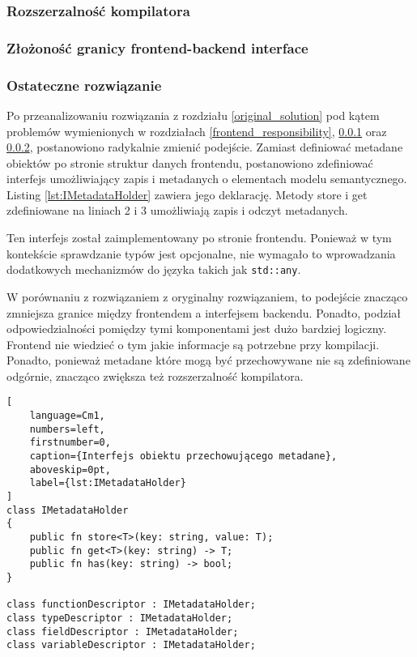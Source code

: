 \subsubsection{Rozszerzalność kompilatora}\label{compiler_extensibility}

\subsubsection{Złożoność granicy frontend-backend interface} \label{frontend_backend_complexity}

\subsubsection{Ostateczne rozwiązanie}\label{final_solution}
Po przeanalizowaniu rozwiązania z rozdziału \ref{original_solution} pod kątem problemów wymienionych w rozdziałach \ref{frontend_responsibility}, \ref{compiler_extensibility} oraz \ref{frontend_backend_complexity}, postanowiono radykalnie zmienić podejście.
Zamiast definiować metadane obiektów po stronie struktur danych frontendu, postanowiono zdefiniować interfejs umożliwiający zapis i metadanych o elementach modelu semantycznego. 
Listing \ref{lst:IMetadataHolder} zawiera jego deklarację.
Metody store i get zdefiniowane na liniach 2 i 3 umożliwiają zapis i odczyt metadanych.

Ten interfejs został zaimplementowany po stronie frontendu.
Ponieważ w tym kontekście sprawdzanie typów jest opcjonalne, nie wymagało to wprowadzania dodatkowych mechanizmów do języka takich jak \texttt{std::any}.

W porównaniu z rozwiązaniem z oryginalny rozwiązaniem, to podejście znacząco zmniejsza granice między frontendem a interfejsem backendu.
Ponadto, podział odpowiedzialności pomiędzy tymi komponentami jest dużo bardziej logiczny.
Frontend nie wiedzieć o tym jakie informacje są potrzebne przy kompilacji.
Ponadto, ponieważ metadane które mogą być przechowywane nie są zdefiniowane odgórnie, znacząco zwiększa też rozszerzalność kompilatora.

\begin{lstlisting}[
    language=Cm1,
    numbers=left,
    firstnumber=0,
    caption={Interfejs obiektu przechowującego metadane},
    aboveskip=0pt,
    label={lst:IMetadataHolder}
]
class IMetadataHolder
{
    public fn store<T>(key: string, value: T);
    public fn get<T>(key: string) -> T;
    public fn has(key: string) -> bool;
}

class functionDescriptor : IMetadataHolder;
class typeDescriptor : IMetadataHolder;
class fieldDescriptor : IMetadataHolder;
class variableDescriptor : IMetadataHolder;
\end{lstlisting}